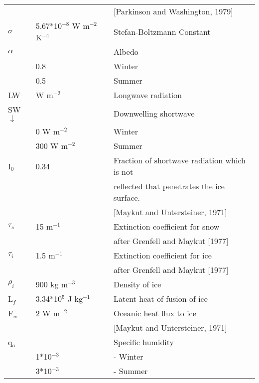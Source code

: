 \begin{tabular}{lll}
 &  &                [Parkinson and Washington, 1979]  \\
$\sigma$ & 5.67*10$^{-8}$ W m$^{-2}$ K$^{-4}$ & Stefan-Boltzmann Constant  \\
$\alpha$ & & Albedo                                                 \\
      & 0.8 & Winter                                                \\
      & 0.5 & Summer                                                \\
LW & W m$^{-2}$    & Longwave radiation                             \\
SW$\downarrow$ & & Downwelling shortwave                            \\
  &   0 W m$^{-2}$ & Winter                                         \\
  & 300 W m$^{-2}$ & Summer                                         \\
I$_0$ & 0.34 & Fraction of shortwave radiation which is not         \\
  & & reflected that penetrates the ice surface.                    \\
  & & [Maykut and Untersteiner, 1971] \\
$\tau_s$ & 15 m$^{-1}$ & Extinction coefficient for snow \\
 & &                after Grenfell and Maykut [1977]              \\
$\tau_i$ & 1.5 m$^{-1}$ & Extinction coefficient for ice \\
 & &                after Grenfell and Maykut [1977]              \\
$\rho_i$ & 900 kg m$^{-3}$ & Density of ice                            \\
L$_f$ & 3.34*10$^{5}$ J kg$^{-1}$ & Latent heat of fusion of ice         \\
F$_w$ & 2 W m$^{-2}$ & Oceanic heat flux to ice\\ 
      &              & [Maykut and Untersteiner, 1971]  \\
q$_a$ & & Specific humidity                           \\
      & 1*10$^{-3}$ & - Winter                        \\
      & 3*10$^{-3}$ & - Summer                        \\
\hline

\end{tabular}

